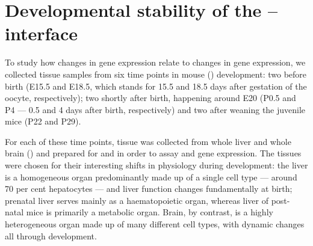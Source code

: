 \chapter{Developmental stability of the -- interface}
\label{sec:trna}

To study how changes in \mrna gene expression relate to changes in \trna gene
expression, we collected tissue samples from six time points in mouse (\mmu)
development: two before birth (E15.5 and E18.5, which stands for \num{15.5} and
\num{18.5} days after gestation of the oocyte, respectively); two shortly after
birth, happening around E20 (P0.5 and P4 --- \num{0.5} and \num{4} days after
birth, respectively) and two after weaning the juvenile mice (P22 and P29).

For each of these time points, tissue was collected from whole liver and whole
brain () and prepared for \rnaseq and  \chipseq in order to
assay \mrna and \trna gene expression. The tissues were chosen for their
interesting shifts in physiology during development: the liver is a homogeneous
organ predominantly made up of a single cell type --- around \num{70} per cent
hepatocytes\todo[ref]{} --- and liver function changes fundamentally at birth;
prenatal liver serves mainly as a haematopoietic organ, whereas liver of
post-natal mice is primarily a metabolic organ.\todo[ref]{} Brain, by contrast,
is a highly heterogeneous organ made up of many different cell types, with
dynamic changes all through development.\todo[ref]{}


